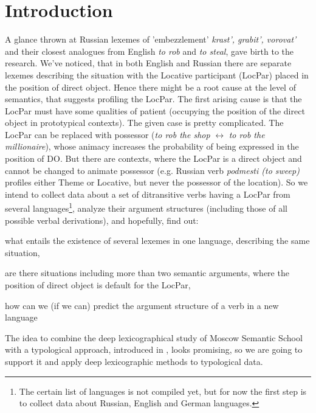 
\section{Introduction} 

A glance thrown at Russian lexemes of 'embezzlement' \textit{krast', grabit', vorovat'} and their closest analogues from English \textit{to rob} and \textit{to steal}, gave birth to the research. We've noticed, that in both English and Russian there are separate lexemes describing the situation with the Locative participant (LocPar) placed in the position of direct object. Hence there might be a root cause at the level of semantics, that suggests profiling the LocPar. The first arising cause is that the LocPar must have some qualities of patient (occupying the position of the direct object in prototypical contexts). The given case is pretty complicated. The LocPar can be replaced with possessor (\textit{to rob the shop} $\leftrightarrow$ \textit{to rob the millionaire}), whose animacy increases the probability of being expressed in the position of DO. But there are contexts, where the LocPar is a direct object and cannot be changed to animate possessor (e.g. Russian verb \textit{podmesti (to sweep)} profiles either Theme or Locative, but never the possessor of the location). So we intend to collect data about a set of ditransitive verbs having a LocPar from several languages\footnote{The certain list of languages is not compiled yet, but for now the first step is to collect data about Russian, English and German languages.}, analyze their argument structures (including those of all possible verbal derivations), and hopefully, find out: \begin{enumerate*}[label=(\roman*),itemjoin={\hskip2mm},after=\hskip2mm,before=\hskip2mm]
\item what entails the existence of several lexemes in one language, describing the same situation,
\item are there situations including more than two semantic arguments, where the position of direct object is default for the LocPar,
\item how can we (if we can) predict the argument structure of a verb in a new language
\end{enumerate*}
The idea to combine the deep lexicographical study of Moscow Semantic School with a typological approach, introduced in \citep{rakhilina2016frame}, looks promising, so we are going to support it and apply deep lexicographic methods to typological data.

